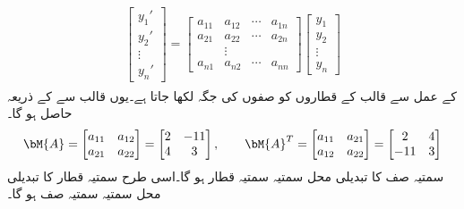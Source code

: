 \begin{gather}
\begin{aligned}
\begin{bmatrix}
y_1'\\
y_2'\\
\vdots\\
y_n'
\end{bmatrix}=
\begin{bmatrix}
a_{11}&a_{12}&\cdots &a_{1n}\\
a_{21}& a_{22}&\cdots &a_{2n}\\
&\vdots & &\\
a_{n1}&a_{n2}&\cdots &a_{nn}
\end{bmatrix}
\begin{bmatrix}
y_1\\
y_2\\
\vdots\\
y_n
\end{bmatrix}
\end{aligned}
\end{gather}
 کے عمل سے قالب کے قطاروں کو صفوں کی جگہ لکھا جاتا ہے۔یوں  قالب  سے  کے ذریعہ   حاصل ہو گا۔ 
\begin{gather*}
\begin{aligned}
\bM{A}=
\begin{bmatrix}
a_{11} & a_{12}\\
a_{21}& a_{22}
\end{bmatrix}=
\begin{bmatrix}
2&-11\\
4&3
\end{bmatrix},\quad \quad
\bM{A}^T=
\begin{bmatrix}
a_{11}& a_{21}\\
a_{12}& a_{22}
\end{bmatrix}=
\begin{bmatrix}
2 &4\\
-11&3
\end{bmatrix}
\end{aligned}
\end{gather*}
سمتیہ صف  کا تبدیلی محل سمتیہ  سمتیہ قطار ہو گا۔اسی طرح سمتیہ قطار  کا تبدیلی محل سمتیہ  سمتیہ صف ہو گا۔
